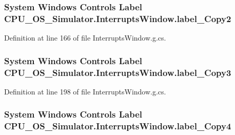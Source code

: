 \subsubsection[{label\+\_\+\+Copy2}]{\setlength{\rightskip}{0pt plus 5cm}System Windows Controls Label C\+P\+U\+\_\+\+O\+S\+\_\+\+Simulator.\+Interrupts\+Window.\+label\+\_\+\+Copy2\hspace{0.3cm}{\ttfamily [package]}}\label{class_c_p_u___o_s___simulator_1_1_interrupts_window_aa7777594076186224c2fb09f79b9de41}


Definition at line 166 of file Interrupts\+Window.\+g.\+cs.

\hypertarget{class_c_p_u___o_s___simulator_1_1_interrupts_window_a6416ce1254faed5ac9fa78bee888a954}{}
\subsubsection[{label\+\_\+\+Copy3}]{\setlength{\rightskip}{0pt plus 5cm}System Windows Controls Label C\+P\+U\+\_\+\+O\+S\+\_\+\+Simulator.\+Interrupts\+Window.\+label\+\_\+\+Copy3\hspace{0.3cm}{\ttfamily [package]}}\label{class_c_p_u___o_s___simulator_1_1_interrupts_window_a6416ce1254faed5ac9fa78bee888a954}


Definition at line 198 of file Interrupts\+Window.\+g.\+cs.

\hypertarget{class_c_p_u___o_s___simulator_1_1_interrupts_window_ad1b975745fe9a61da3de1f80d0dcf902}{}
\subsubsection[{label\+\_\+\+Copy4}]{\setlength{\rightskip}{0pt plus 5cm}System Windows Controls Label C\+P\+U\+\_\+\+O\+S\+\_\+\+Simulator.\+Interrupts\+Window.\+label\+\_\+\+Copy4\hspace{0.3cm}{\ttfamily [package]}}\label{class_c_p_u___o_s___simulator_1_1_interrupts_window_ad1b975745fe9a61da3de1f80d0dcf902}



